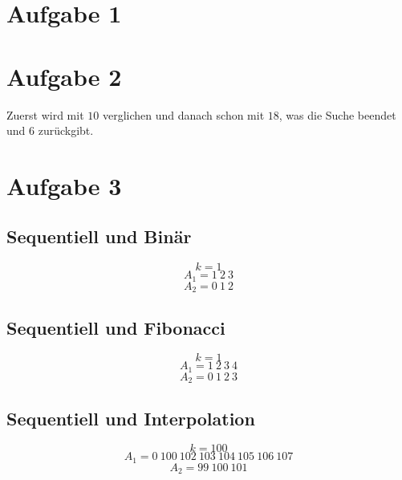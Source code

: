 \documentclass[10pt,a4paper]{article}
\begin{document}
\section{Aufgabe 1}

\section{Aufgabe 2}
Zuerst wird mit $10$ verglichen und danach schon mit $18$, was die Suche beendet und $6$ zurückgibt.

\section{Aufgabe 3}

\subsection{Sequentiell und Binär}
\begin{equation}
  k = 1
\end{equation}
\begin{equation}
  A_{1} = 1\ 2\ 3
\end{equation}
\begin{equation}
  A_{2} = 0\ 1\ 2
\end{equation}

\subsection{Sequentiell und Fibonacci}
\begin{equation}
  k = 1
\end{equation}
\begin{equation}
  A_{1} = 1\ 2\ 3\ 4
\end{equation}
\begin{equation}
  A_{2} = 0\ 1\ 2\ 3
\end{equation}

\subsection{Sequentiell und Interpolation}
\begin{equation}
  k = 100
\end{equation}
\begin{equation}
  A_{1} = 0\ 100\ 102\ 103\ 104\ 105\ 106\ 107
\end{equation}
\begin{equation}
  A_{2} = 99\ 100\ 101
\end{equation}
\end{document}
